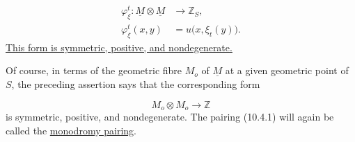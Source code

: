 \begin{equation}\tag{10.4.2}
\begin{aligned}
\varphi_\xi^t:\underline M\otimes\underline M
  &\longrightarrow\mathbb Z_S,\\
\varphi_\xi^t(x,y)&=u\bigl(x,\xi_t(y)\bigr).
\end{aligned}
\end{equation}
\underline{This form is symmetric, positive, and nondegenerate.}

Of course, in terms of the geometric fibre $M_o$ of $\underline M$ at a
given geometric point of $S$, the preceding assertion says that the
corresponding form

\begin{equation*}
M_o\otimes M_o\longrightarrow\mathbb Z
\end{equation*}
is symmetric, positive, and nondegenerate. The pairing (10.4.1) will
again be called the \underline{monodromy pairing}.

